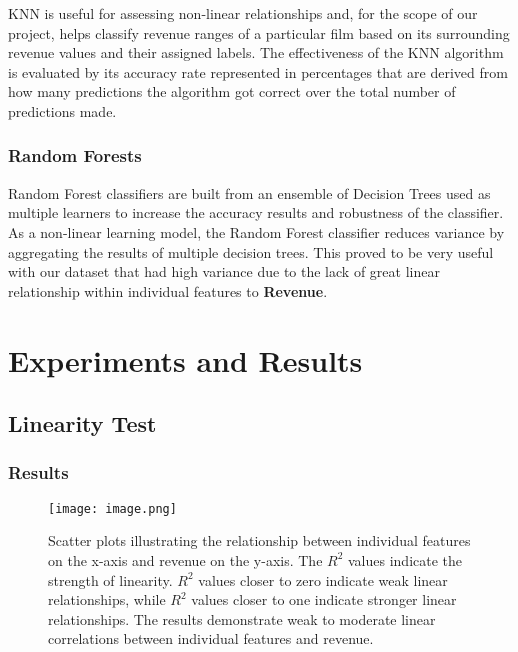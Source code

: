 \documentclass{article}
\begin{document}
KNN is useful for assessing non-linear relationships and, for the scope of our project, helps classify revenue ranges of a particular film based on its surrounding revenue values and their assigned labels. The effectiveness of the KNN algorithm is evaluated by its accuracy rate represented in percentages that are derived from how many predictions the algorithm got correct over the total number of predictions made.

\subsubsection{Random Forests}
Random Forest classifiers are built from an ensemble of Decision Trees used as multiple learners to increase the accuracy results and robustness of the classifier. As a non-linear learning model, the Random Forest classifier reduces variance by aggregating the results of multiple decision trees. This proved to be very useful with our dataset that had high variance due to the lack of great linear relationship within individual features to \textbf{Revenue}.

\section{Experiments and Results}
\label{results}
\subsection{Linearity Test}
\subsubsection{Results}
\begin{figure}[H] 
    \centering
    \vspace{0.3cm} 
    \texttt{[image: image.png]} 
    \caption{Scatter plots illustrating the relationship between individual features on the x-axis and revenue on the y-axis. The \( R^2 \) values indicate the strength of linearity. \( R^2 \) values closer to zero indicate weak linear relationships, while \( R^2 \) values closer to one indicate stronger linear relationships. The results demonstrate weak to moderate linear correlations between individual features and revenue.}
    \label{fig:scatter_plots}
\end{figure}
\end{document}
